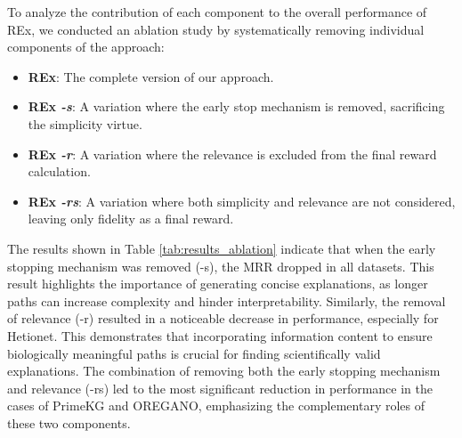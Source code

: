 \documentclass{article}
\theoremstyle{definition}
\begin{document}
To analyze the contribution of each component to the overall performance of REx, we conducted an ablation study by systematically removing individual components of the approach:
\begin{itemize}
    \item \textbf{REx}: The complete version of our approach. 
    \item \textbf{REx \textit{-s}}: A variation where the early stop mechanism is removed, sacrificing the simplicity virtue.
    \item \textbf{REx \textit{-r}}: A variation where the relevance is excluded from the final reward calculation.
    \item \textbf{REx \textit{-rs}}: A variation where both simplicity and relevance are not considered, leaving only fidelity as a final reward. 
\end{itemize}


The results shown in Table \ref{tab:results_ablation} indicate that when the early stopping mechanism was removed (-s), the MRR dropped in all datasets. This result highlights the importance of generating concise explanations, as longer paths can increase complexity and hinder interpretability. Similarly, the removal of relevance (-r) resulted in a noticeable decrease in performance, especially for Hetionet. This demonstrates that incorporating information content to ensure biologically meaningful paths is crucial for finding scientifically valid explanations. The combination of removing both the early stopping mechanism and relevance (-rs) led to the most significant reduction in performance in the cases of PrimeKG and OREGANO, emphasizing the complementary roles of these two components.
\end{document}

